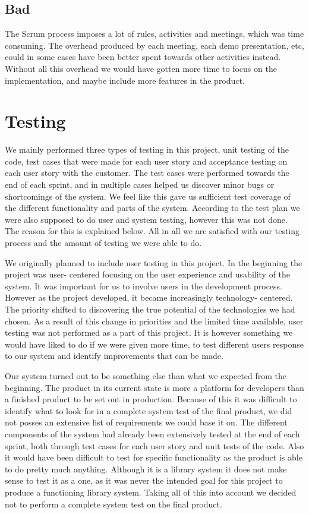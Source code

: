 \subsection*{Bad}
The Scrum process imposes a lot of rules, activities and meetings, which was time consuming. The overhead produced by each meeting, each demo presentation, etc, could in some cases have been better spent towards other activities instead. Without all this overhead we would have gotten more time to focus on the implementation, and maybe include more features in the product.


\section{Testing}
We mainly performed three types of testing in this project, unit testing of the code, test cases that were made for each user story and acceptance testing on each user story with the customer. The test cases were performed towards the end of each sprint, and in multiple cases helped us discover minor bugs or shortcomings of the system. We feel like this gave us sufficient test coverage of the different functionality and parts of the system. According to the test plan we were also supposed to do user and system testing, however this was not done. The reason for this is explained below. All in all we are satisfied with our testing process and the amount of testing we were able to do.

We originally planned to include user testing in this project. In the beginning the project was user- centered focusing on the user experience and usability of the system. It was important for us to involve users in the development process. However as the project developed, it became increasingly technology- centered. The priority shifted to discovering the true potential of the technologies we had chosen. As a result of this change in priorities and the limited time available, user testing was not performed as a part of this project. It is however something we would have liked to do if we were given more time, to test different users response to our system and identify improvements that can be made.

Our system turned out to be something else than what we expected from the beginning. The product in its current state is more a platform for developers than a finished product to be set out in production. Because of this it was difficult to identify what to look for in a complete system test of the final product, we did not posses an extensive list of requirements we could base it on. The different components of the system had already been extensively tested at the end of each sprint, both through test cases for each user story and unit tests of the code. Also it would have been difficult to test for specific functionality as the product is able to do pretty much anything. Although it is a library system it does not make sense to test it as a one, as it was never the intended goal for this project to produce a functioning library system. Taking all of this into account we decided not to perform a complete system test on the final product.


